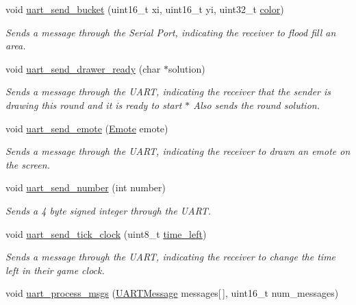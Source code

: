\begin{DoxyCompactItemize}
void \mbox{\hyperlink{group__uart__wordgame_ga83e5f9cd1712f2eec7dbdca9704004a5}{uart\+\_\+send\+\_\+bucket}} (uint16\+\_\+t xi, uint16\+\_\+t yi, uint32\+\_\+t \mbox{\hyperlink{structcolor}{color}})
\begin{DoxyCompactList}\small\item\em Sends a message through the Serial Port, indicating the receiver to flood fill an area. \end{DoxyCompactList}\item 
void \mbox{\hyperlink{group__uart__wordgame_ga84ae87284e5c2263f8d7c85b560f915a}{uart\+\_\+send\+\_\+drawer\+\_\+ready}} (char $\ast$solution)
\begin{DoxyCompactList}\small\item\em Sends a message through the U\+A\+RT, indicating the receiver that the sender is drawing this round and it is ready to start $\ast$ Also sends the round solution. \end{DoxyCompactList}\item 
void \mbox{\hyperlink{group__uart__wordgame_ga5cc4c7bd39ce863e14dde99a5f22f0e4}{uart\+\_\+send\+\_\+emote}} (\mbox{\hyperlink{group__emote_ga0e527855c554e31654c9beb340145574}{Emote}} emote)
\begin{DoxyCompactList}\small\item\em Sends a message through the U\+A\+RT, indicating the receiver to drawn an emote on the screen. \end{DoxyCompactList}\item 
void \mbox{\hyperlink{group__uart__wordgame_ga2fc51e28d4b47e1ff96700527aea6ffd}{uart\+\_\+send\+\_\+number}} (int number)
\begin{DoxyCompactList}\small\item\em Sends a 4 byte signed integer through the U\+A\+RT. \end{DoxyCompactList}\item 
void \mbox{\hyperlink{group__uart__wordgame_gaecefc87c97278f130cc9b72b8fa413c8}{uart\+\_\+send\+\_\+tick\+\_\+clock}} (uint8\+\_\+t \mbox{\hyperlink{wordpicker_8c_aad18a277e8cd8821dc805d23b6a70a75}{time\+\_\+left}})
\begin{DoxyCompactList}\small\item\em Sends a message through the U\+A\+RT, indicating the receiver to change the time left in their game clock. \end{DoxyCompactList}\item 
void \mbox{\hyperlink{group__uart__wordgame_ga1dbbd888f62428123dfc5bbbfa178134}{uart\+\_\+process\+\_\+msgs}} (\mbox{\hyperlink{struct_u_a_r_t_message}{U\+A\+R\+T\+Message}} messages\mbox{[}$\,$\mbox{]}, uint16\+\_\+t num\+\_\+messages)

\end{DoxyCompactItemize}
